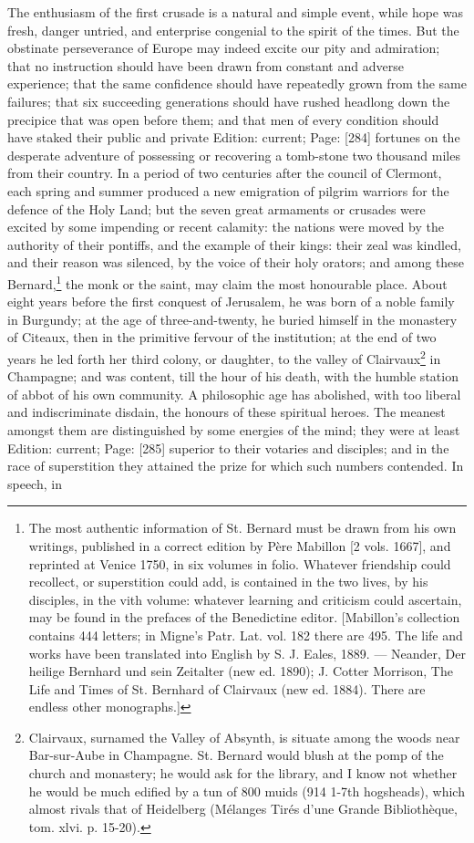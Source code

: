 The enthusiasm of the first crusade is a natural and simple event, while hope was fresh, danger untried, and enterprise congenial to the spirit of the times. But the obstinate perseverance of Europe may indeed excite our pity and admiration; that no instruction should have been drawn from constant and adverse experience; that the same confidence should have repeatedly grown from the same failures; that six succeeding generations should have rushed headlong down the precipice that was open before them; and that men of every condition should have staked their public and private Edition: current; Page: [284] fortunes on the desperate adventure of possessing or recovering a tomb-stone two thousand miles from their country. In a period of two centuries after the council of Clermont, each spring and summer produced a new emigration of pilgrim warriors for the defence of the Holy Land; but the seven great armaments or crusades were excited by some impending or recent calamity: the nations were moved by the authority of their pontiffs, and the example of their kings: their zeal was kindled, and their reason was silenced, by the voice of their holy orators; and among these Bernard,\footnote{The most authentic information of St. Bernard must be drawn from his own writings, published in a correct edition by Père Mabillon [2 vols. 1667], and reprinted at Venice 1750, in six volumes in folio. Whatever friendship could recollect, or superstition could add, is contained in the two lives, by his disciples, in the vith volume: whatever learning and criticism could ascertain, may be found in the prefaces of the Benedictine editor. [Mabillon\texthebrew{}’s collection contains 444 letters; in Migne\texthebrew{}’s Patr. Lat. vol. 182 there are 495. The life and works have been translated into English by S. J. Eales, 1889. \texthebrew{—} Neander, Der heilige Bernhard und sein Zeitalter (new ed. 1890); J. Cotter Morrison, The Life and Times of St. Bernhard of Clairvaux (new ed. 1884). There are endless other monographs.]} the monk or the saint, may claim the most honourable place. About eight years before the first conquest of Jerusalem, he was born of a noble family in Burgundy; at the age of three-and-twenty, he buried himself in the monastery of Citeaux, then in the primitive fervour of the institution; at the end of two years he led forth her third colony, or daughter, to the valley of Clairvaux\footnote{Clairvaux, surnamed the Valley of Absynth, is situate among the woods near Bar-sur-Aube in Champagne. St. Bernard would blush at the pomp of the church and monastery; he would ask for the library, and I know not whether he would be much edified by a tun of 800 muids (914 1-7th hogsheads), which almost rivals that of Heidelberg (Mélanges Tirés d\texthebrew{}’une Grande Bibliothèque, tom. xlvi. p. 15-20).} in Champagne; and was content, till the hour of his death, with the humble station of abbot of his own community. A philosophic age has abolished, with too liberal and indiscriminate disdain, the honours of these spiritual heroes. The meanest amongst them are distinguished by some energies of the mind; they were at least Edition: current; Page: [285] superior to their votaries and disciples; and in the race of superstition they attained the prize for which such numbers contended. In speech, in 